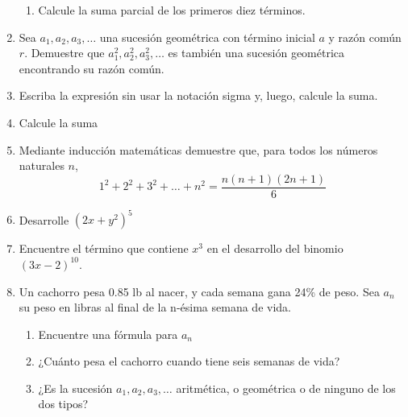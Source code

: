 \documentclass[letterpaper,twoside]{article}
\begin{document}
\begin{enumerate}
\begin{enumerate}
\item Calcule la suma parcial de los primeros diez términos.
\end{enumerate}
\item Sea $a_{1}, a_{2}, a_{3}, \ldots$ una sucesión geométrica con término inicial $a$ y razón común $r$. Demuestre que $a_{1}^{2},a_{2}^{2},a_{3}^{2}, \ldots$ es también una sucesión geométrica encontrando su razón común.
\item Escriba la expresión sin usar la notación sigma y, luego, calcule la suma.
\begin{enumerate}
\end{enumerate}
\item Calcule la suma
\begin{enumerate}
\end{enumerate}
\item Mediante inducción matemáticas demuestre que, para todos los números naturales $n$,
\[1^{2}+2^{2}+3^{2}+\ldots+n^{2}=\dfrac{n(n+1)(2n+1)}{6}\]
\item Desarrolle $(2x+y^{2})^{5}$
\item Encuentre el término que contiene $x^{3}$ en el desarrollo del binomio $(3x-2)^{10}$.
\item Un cachorro pesa 0.85 lb al nacer, y cada semana gana 24\% de peso. Sea $a_{n}$ su peso en libras al final de la n-ésima semana de vida.
\begin{enumerate}
\item Encuentre una fórmula para $a_{n}$
\item ¿Cuánto pesa el cachorro cuando tiene seis semanas de vida?
\item ¿Es la sucesión $a_{1},a_{2},a_{3},\ldots$ aritmética, o geométrica o de ninguno de los dos tipos?
\end{enumerate}

\end{enumerate}
\end{document}
